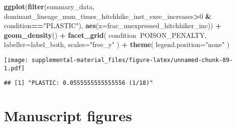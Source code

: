 \documentclass[]{book}
\newenvironment{Shaded}{\begin{snugshade}}{\end{snugshade}}
\newcommand{\DataTypeTok}[1]{\textcolor[rgb]{0.13,0.29,0.53}{#1}}
\newcommand{\DecValTok}[1]{\textcolor[rgb]{0.00,0.00,0.81}{#1}}
\newcommand{\FloatTok}[1]{\textcolor[rgb]{0.00,0.00,0.81}{#1}}
\newcommand{\KeywordTok}[1]{\textcolor[rgb]{0.13,0.29,0.53}{\textbf{#1}}}
\newcommand{\NormalTok}[1]{#1}
\newcommand{\OperatorTok}[1]{\textcolor[rgb]{0.81,0.36,0.00}{\textbf{#1}}}
\newcommand{\StringTok}[1]{\textcolor[rgb]{0.31,0.60,0.02}{#1}}
\begin{document}
\begin{Shaded}
\begin{Highlighting}[]
\KeywordTok{ggplot}\NormalTok{(}\KeywordTok{filter}\NormalTok{(summary_data, dominant_lineage_num_times_hitchhike_inst_exec_increases}\OperatorTok{>}\DecValTok{0} \OperatorTok{&}\StringTok{ }\NormalTok{condition}\OperatorTok{==}\StringTok{"PLASTIC"}\NormalTok{), }\KeywordTok{aes}\NormalTok{(}\DataTypeTok{x=}\NormalTok{frac_unexpressed_hitchhiker_inc)) }\OperatorTok{+}
\StringTok{  }\KeywordTok{geom_density}\NormalTok{() }\OperatorTok{+}
\StringTok{  }\KeywordTok{facet_grid}\NormalTok{(}
\NormalTok{    condition}\OperatorTok{~}\NormalTok{POISON_PENALTY,}
    \DataTypeTok{labeller=}\NormalTok{label_both,}
    \DataTypeTok{scales=}\StringTok{"free_y"}
\NormalTok{  ) }\OperatorTok{+}
\StringTok{  }\KeywordTok{theme}\NormalTok{(}
    \DataTypeTok{legend.position=}\StringTok{"none"}
\NormalTok{  )}
\end{Highlighting}
\end{Shaded}

\texttt{[image: supplemental-material\_files/figure-latex/unnamed-chunk-89-1.pdf]}

\begin{Shaded}
\end{Shaded}

\begin{verbatim}
## [1] "PLASTIC: 0.0555555555555556 (1/18)"
\end{verbatim}

\hypertarget{manuscript-figures-2}{%
\section{Manuscript figures}\label{manuscript-figures-2}}
\end{document}
